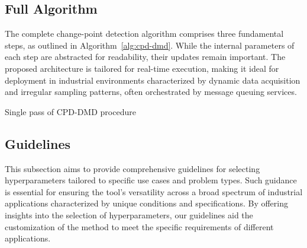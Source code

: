 \subsection{Full Algorithm}
The complete change-point detection algorithm comprises three fundamental steps, as outlined in Algorithm~\ref{alg:cpd-dmd}. While the internal parameters of each step are abstracted for readability, their updates remain important. The proposed architecture is tailored for real-time execution, making it ideal for deployment in industrial environments characterized by dynamic data acquisition and irregular sampling patterns, often orchestrated by message queuing services.

\begin{algorithm}
    \caption{Single pass of CPD-DMD procedure}\label{alg:cpd-dmd}
    \begin{algorithmic}[1]

    \end{algorithmic}
\end{algorithm}

\subsection{Guidelines}\label{sec:guidelines}
This subsection aims to provide comprehensive guidelines for selecting hyperparameters tailored to specific use cases and problem types. Such guidance is essential for ensuring the tool's versatility across a broad spectrum of industrial applications characterized by unique conditions and specifications. By offering insights into the selection of hyperparameters, our guidelines aid the customization of the method to meet the specific requirements of different applications.

